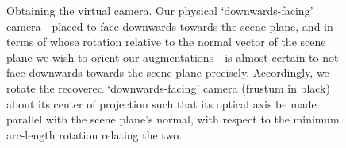 \documentclass[review]{elsarticle}
\begin{document}
\begin{figure}[t]
    \centering
    \qquad
    \caption{Obtaining the virtual camera. Our physical `downwards-facing' camera---placed to face downwards towards the scene plane, and in terms of whose rotation relative to the normal vector of the scene plane we wish to orient our augmentations---is almost certain to not face downwards towards the scene plane precisely. Accordingly, we rotate the recovered `downwards-facing' camera (frustum in black) about its center of projection such that its optical axis be made parallel with the scene plane's normal, with respect to the minimum arc-length rotation relating the two.} %
    \label{fig:virtualcam}
\end{figure} 
\end{document}
